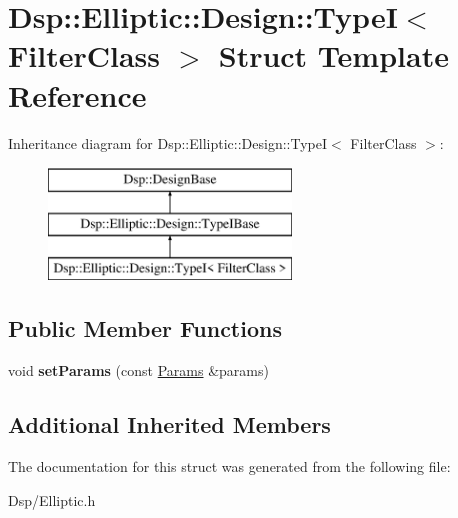 \hypertarget{structDsp_1_1Elliptic_1_1Design_1_1TypeI}{\section{Dsp\-:\-:Elliptic\-:\-:Design\-:\-:Type\-I$<$ Filter\-Class $>$ Struct Template Reference}
\label{structDsp_1_1Elliptic_1_1Design_1_1TypeI}
}
Inheritance diagram for Dsp\-:\-:Elliptic\-:\-:Design\-:\-:Type\-I$<$ Filter\-Class $>$\-:\begin{figure}[H]
\begin{center}
\leavevmode
\includegraphics[height=3.000000cm]{structDsp_1_1Elliptic_1_1Design_1_1TypeI}
\end{center}
\end{figure}
\subsection*{Public Member Functions}
\begin{DoxyCompactItemize}
\item 
\hypertarget{structDsp_1_1Elliptic_1_1Design_1_1TypeI_a8058fb79c6c4394930069150ab90f3a7}{void {\bfseries set\-Params} (const \hyperlink{structDsp_1_1Params}{Params} \&params)}\label{structDsp_1_1Elliptic_1_1Design_1_1TypeI_a8058fb79c6c4394930069150ab90f3a7}

\end{DoxyCompactItemize}
\subsection*{Additional Inherited Members}


The documentation for this struct was generated from the following file\-:\begin{DoxyCompactItemize}
\item 
Dsp/Elliptic.\-h\end{DoxyCompactItemize}
